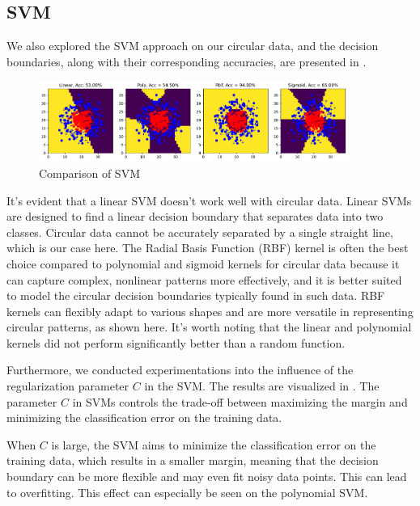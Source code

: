 \subsection{SVM}

We also explored the SVM approach on our circular data, and the decision boundaries, along with their corresponding accuracies, are presented in .

\begin{figure}[H]
    \centering
    \includegraphics[width=0.9\textwidth]{figs/NN/svm_comparison.pdf}
    \caption{Comparison of SVM}
    \label{fig:svm_comparison}
\end{figure}

It's evident that a linear SVM doesn't work well with circular data. Linear SVMs are designed to find a linear decision boundary that separates data into two classes. Circular data cannot be accurately separated by a single straight line, which is our case here. The Radial Basis Function (RBF) kernel is often the best choice compared to polynomial and sigmoid kernels for circular data because it can capture complex, nonlinear patterns more effectively, and it is better suited to model the circular decision boundaries typically found in such data. RBF kernels can flexibly adapt to various shapes and are more versatile in representing circular patterns, as shown here. It's worth noting that the linear and polynomial kernels did not perform significantly better than a random function.

Furthermore, we conducted experimentations into the influence of the regularization parameter $C$ in the SVM. The results are visualized in . The parameter $C$ in SVMs controls the trade-off between maximizing the margin and minimizing the classification error on the training data. 

When $C$ is large, the SVM aims to minimize the classification error on the training data, which results in a smaller margin, meaning that the decision boundary can be more flexible and may even fit noisy data points. This can lead to overfitting. This effect can especially be seen on the polynomial SVM. 

